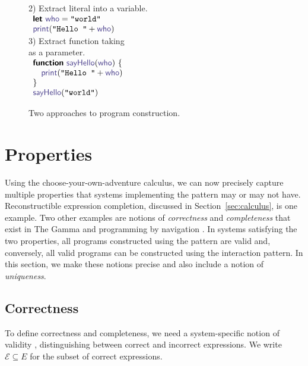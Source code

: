 \documentclass[nonacm,anonymous,sigplan,screen]{acmart}
\newcommand{\ident}[1]{\textsf{\color{DarkSlateBlue}{#1}}}
\newcommand{\kvd}[1]{\textsf{\bfseries #1}}
\begin{document}
\begin{figure}[t]
\begin{minipage}[t]{.49\columnwidth}
2) Extract literal into a variable.\\[0.75em]
  $\begin{array}{l}
  \kvd{let}~\ident{who} = \texttt{''world''}\\
  \ident{print}(\texttt{''Hello ''} + \ident{who})
  \end{array}$
\\[0.25em]

3) Extract function taking \\
 \ident{who} as a parameter.\\[0.75em]
  $\begin{array}{l}
  \kvd{function}~\ident{sayHello}(\ident{who})~\{\\
  \quad\ident{print}(\texttt{''Hello ''} + \ident{who})\\
  \}\\
  \ident{sayHello}(\texttt{''world''})
  \end{array}$
\end{minipage}
\vspace{-0.5em}
\caption{Two approaches to program construction.}
\label{fig:grammar}
\vspace{-0.5em}
\end{figure}

\section{Properties}
\label{sec:properties}

Using the choose-your-own-adventure calculus, we can now precisely capture multiple properties that
systems implementing the pattern may or may not have. Reconstructible expression completion,
discussed in Section~\ref{sec:calculus}, is one example. Two other examples are notions
of \emph{correctness} and \emph{completeness} that exist in The Gamma \cite{petricek-2022-thegamma} and
programming by navigation \cite{lubin-2025-pbn}. In systems satisfying the two properties, all
programs  constructed using the pattern are valid and, conversely, all valid programs can be
constructed using the interaction pattern. In this section, we make these notions precise and
also include a notion of \emph{uniqueness}.

\subsection{Correctness}
To define correctness and completeness, we need a system-specific notion of validity
\cite{lubin-2025-pbn}, distinguishing between correct and incorrect
expressions. We write $\mathcal{E} \subseteq E$ for the subset of correct expressions.
\end{document}
